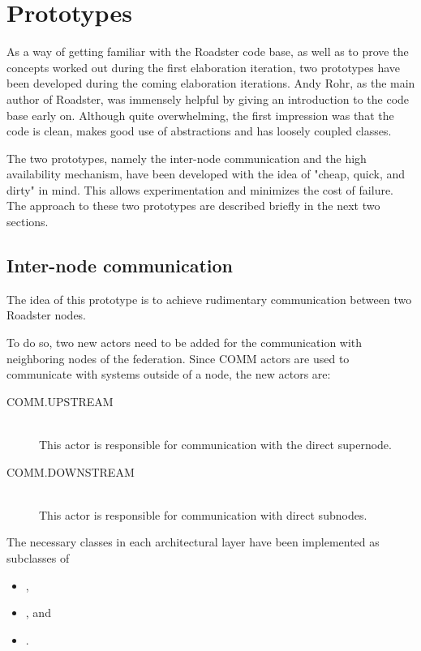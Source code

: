 \section{Prototypes}\label{sec:approach:prototypes}
As a way of getting familiar with the Roadster code base, as well as to prove
the concepts worked out during the first elaboration iteration, two prototypes have
been developed during the coming elaboration iterations. Andy Rohr, as the
main author of Roadster, was immensely helpful by giving an introduction to
the code base early on.  Although quite overwhelming, the first impression was
that the code is clean, makes good use of abstractions and has loosely coupled
classes.

The two prototypes, namely the inter-node communication and the high availability
mechanism, have been developed with the idea of "cheap, quick, and dirty" in mind. This
allows experimentation and minimizes the cost of failure.
The approach to these two prototypes are described briefly in the next two sections.


\subsection{Inter-node communication}
The idea of this prototype is to achieve rudimentary communication between two
Roadster nodes.

To do so, two new actors need to be added for the communication with neighboring nodes of the
federation.  Since COMM actors are used to communicate with systems outside of
a node, the new actors are:
\begin{description}
\item [COMM.UPSTREAM]\hfill\\
This actor is responsible for communication with the direct supernode.
\item [COMM.DOWNSTREAM]\hfill\\
This actor is responsible for communication with direct subnodes.
\end{description}

The necessary classes in each architectural layer have been implemented as
subclasses of
\begin{itemize}
\item {},
\item {}, and
\item {}.
\end{itemize}

